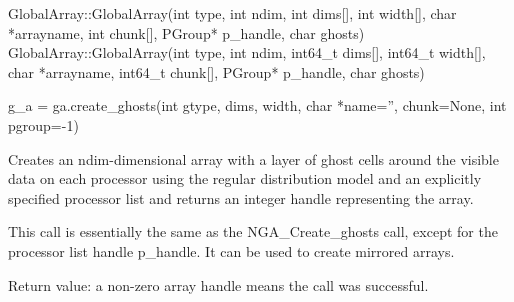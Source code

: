 \documentclass[12pt]{article}
\begin{document}
\begin{cxxapi}
\begin{cxxcode}
GlobalArray::GlobalArray(int type, int ndim, int dims[], int width[],
                         char *arrayname, int chunk[], PGroup* p_handle,
                         char ghosts)
GlobalArray::GlobalArray(int type, int ndim, int64_t dims[], int64_t width[],
                         char *arrayname, int64_t chunk[], PGroup* p_handle,
                         char ghosts)
\end{cxxcode}
\begin{funcargs}
\end{funcargs}
\end{cxxapi}

\begin{pyapi}
\begin{pycode}
g_a = ga.create_ghosts(int gtype, dims, width, char *name='',
                       chunk=None, int pgroup=-1)
\end{pycode}
\begin{funcargs}
\end{funcargs}
\end{pyapi}

\dcoll

\begin{desc}

Creates an ndim-dimensional array with a layer of ghost cells around the
visible data on each processor using the regular distribution model and an
explicitly specified processor list and returns an integer handle representing
the array.

This call is essentially the same as the NGA_Create_ghosts call, except for the
processor list handle p_handle. It can be used to create mirrored arrays.

Return value: a non-zero array handle means the call was successful.

\end{desc}
\end{document}
